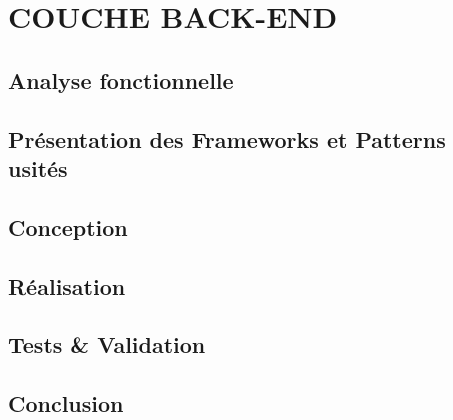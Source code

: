 \setcounter{chapter}{4}
\chapter{          COUCHE BACK-END}
\minitoc %
\graphicspath{{Chapitre5/figures/}}


\pagestyle{fancy}
\fancyhf{}
\fancyhead[R]{\bfseries\rightmark}
\fancyfoot[R]{\thepage}
\renewcommand{\headrulewidth}{0.5pt}
\renewcommand{\footrulewidth}{0pt}
\renewcommand{\chaptermark}[1]{\markboth{\MakeUppercase{\chaptername~\thechapter. #1 }}{}}
\renewcommand{\sectionmark}[1]{\markright{\thechapter.\thesection~ #1}}

\begin{spacing}{1.5}

\section*{Analyse fonctionnelle}



\section{Présentation des Frameworks et Patterns usités}


\section{Conception}


\section{Réalisation}


\section{Tests \& Validation}


\section*{Conclusion}


\end{spacing}
